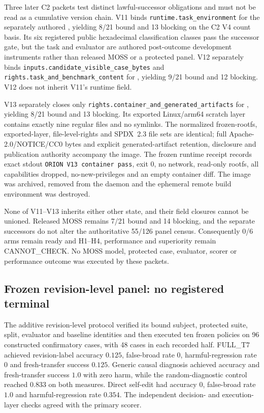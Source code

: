 Three later C2 packets test distinct lawful-successor obligations and must not
be read as a cumulative version chain. V11 binds
\texttt{runtime.task\_environment} for the separately authored
, yielding 8/21 bound
and 13 blocking on the C2 V4 count basis. Its six registered public hexadecimal
classification classes pass the successor gate, but the task and evaluator are
authored post-outcome development instruments rather than released MOSS or a
protected panel. V12 separately binds
\texttt{inputs.candidate\_visible\_case\_bytes} and
\texttt{rights.task\_and\_benchmark\_content} for
, yielding
9/21 bound and 12 blocking. V12 does not inherit V11's runtime field.

V13 separately closes only
\texttt{rights.container\_and\_generated\_artifacts} for
, yielding
8/21 bound and 13 blocking. Its exported Linux/arm64 scratch layer contains
exactly nine regular files and no symlinks. The normalized frozen-rootfs,
exported-layer, file-level-rights and SPDX~2.3 file sets are identical; full
Apache-2.0/NOTICE/CC0 bytes and explicit generated-artifact retention,
disclosure and publication authority accompany the image. The frozen runtime
receipt records exact stdout \texttt{ORION V13 container pass\string\n}, exit 0, no
network, read-only rootfs, all capabilities dropped, no-new-privileges and an
empty container diff. The image was archived, removed from the daemon and the
ephemeral remote build environment was destroyed.

None of V11--V13 inherits either other state, and their field closures cannot
be unioned. Released MOSS remains 7/21 bound and 14 blocking, and the separate
successors do not alter the authoritative 55/126 panel census. Consequently
0/6 arms remain ready and H1--H4, performance and superiority remain
\textsf{CANNOT\_CHECK}. No MOSS model, protected case, evaluator, scorer or
performance outcome was executed by these packets.

\subsection*{Frozen revision-level panel: no registered terminal}

The additive revision-level protocol verified its bound subject, protected
suite, split, evaluator and baseline identities and then executed ten frozen
policies on 96 constructed confirmatory cases, with 48 cases in each recorded
half. FULL\_T7 achieved revision-label accuracy $0.125$, false-broad rate
$0$, harmful-regression rate $0$ and fresh-transfer success $0.125$. Generic
causal diagnosis achieved accuracy and fresh-transfer success $1.0$ with zero
harm, while the random-diagnostic control reached $0.833$ on both measures.
Direct self-edit had accuracy $0$, false-broad rate $1.0$ and harmful-regression
rate $0.354$. The independent decision- and execution-layer checks agreed with
the primary scorer.

